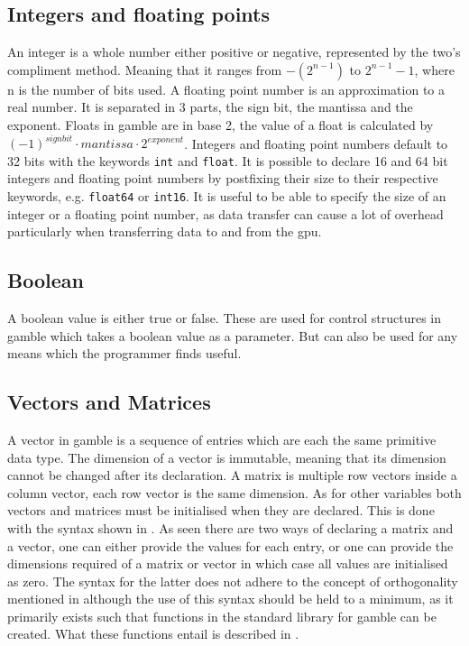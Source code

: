 \subsection*{Integers and floating points}
An integer is a whole number either positive or negative, represented by the two's compliment method. 
Meaning that it ranges from $-(2^{n-1}) $ to $2^{n-1} - 1 $, where n is the number of bits used.
A floating point number is an approximation to a real number. 
It is separated in 3 parts, the sign bit, the mantissa and the exponent. 
Floats in \gls{gamble} are in base 2, the value of a float is calculated by $ {(-1)}^{sign bit} \cdot mantissa \cdot 2^{exponent} $. 
Integers and floating point numbers default to 32 bits with the keywords \texttt{int} and \texttt{float}. 
It is possible to declare 16 and 64 bit integers and floating point numbers by postfixing their size to their respective keywords, e.g. \texttt{float64} or \texttt{int16}. 
It is useful to be able to specify the size of an integer or a floating point number, as data transfer can cause a lot of overhead particularly when transferring data to and from the \acrshort{gpu}. 

\subsection*{Boolean}
A boolean value is either true or false. 
These are used for control structures in \gls{gamble} which takes a boolean value as a parameter. 
But can also be used for any means which the programmer finds useful. 

\subsection*{Vectors and Matrices}
A vector in \gls{gamble} is a sequence of entries which are each the same primitive data type. 
The dimension of a vector is immutable, meaning that its dimension cannot be changed after its declaration. 
A matrix is multiple row vectors inside a column vector, each row vector is the same dimension. 
As for other variables both vectors and matrices must be initialised when they are declared. 
This is done with the syntax shown in .
As seen there are two ways of declaring a matrix and a vector, one can either provide the values for each entry, or one can provide the dimensions required of a matrix or vector in which case all values are initialised as zero.
The syntax for the latter does not adhere to the concept of orthogonality mentioned in  although the use of this syntax should be held to a minimum, as it primarily exists such that functions in the standard library for \gls{gamble} can be created.
What these functions entail is described in .

